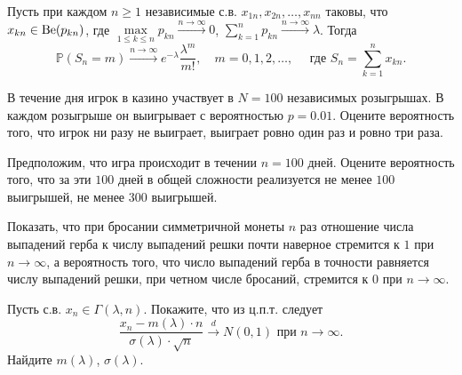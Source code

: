 \begin{problem}
Пусть при каждом $n\geqslant 1$ независимые с.в. $x_{1n}, x_{2n},\ldots, x_{nn}$ таковы, что $x_{kn}\in \mathrm{Be}(p_{kn})$, где 
$\max\limits_{1\leqslant k\leqslant n} p_{kn}\xrightarrow{n\to\infty}0$, $\sum\limits_{k=1}^{n}p_{kn}\xrightarrow{n\to\infty}\lambda$. 
Тогда 
\begin{equation}
\label{TPois}
{\mathbb P}(S_n=m)\xrightarrow{n\to\infty} e^{-\lambda}\frac{\lambda^m}{m!}, \quad m=0,1,2,\ldots, \quad 
\text{ где } S_n=\sum\limits_{k=1}^{n} x_{kn} . 
\end{equation}
\end{problem}

\begin{problem}
В течение дня игрок в казино участвует в $N=100$ независимых розыгрышах. В каждом розыгрыше он выигрывает с вероятностью 
$p=0.01$. Оцените вероятность того, что игрок ни разу не выиграет, выиграет ровно 
один раз и ровно три раза.

Предположим, что игра происходит в течении $n=100$ дней. 
Оцените вероятность того, что за эти $100$ дней в общей сложности реализуется не менее $100$ выигрышей, не менее $300$ выигрышей. 


\end{problem}



\begin{problem}

Показать, что при бросании симметричной монеты $n$ раз отношение числа выпадений герба к числу выпадений решки почти наверное стремится 
к $1$ при $n\to\infty$, а вероятность того, что число выпадений герба в точности равняется числу выпадений решки, при четном числе 
бросаний, стремится к $0$ при $n\to\infty$. 
\end{problem}



\begin{problem} 
Пусть с.в. $x_n\in \Gamma(\lambda,n)$. Покажите, что из ц.п.т. следует 
$$
\frac{x_n-m(\lambda)\cdot n}{\sigma(\lambda)\cdot\sqrt{n}} \xrightarrow{d} N(0,1) \text{ при } n\to\infty . 
$$
Найдите $m(\lambda)$, $\sigma(\lambda)$. 
\end{problem}


